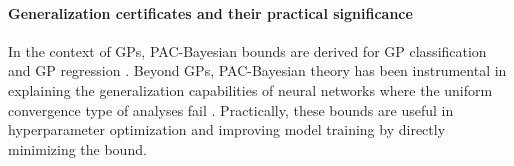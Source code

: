 %


\paragraph{Generalization certificates and their practical significance}
In the context of GPs, PAC-Bayesian bounds are derived for GP classification  \citet{seeger2002pac} and GP regression \citep{suzuki2012pac}. 
Beyond GPs, PAC-Bayesian theory has been instrumental in explaining the generalization capabilities of neural networks where the uniform convergence type of analyses fail \citep{dziugaite2017computing,lotfi2022pac}.
Practically, these bounds are useful in hyperparameter optimization \citep{cherian2020efficient} and improving model training \citep{reeb2018learning,wang2023improving} by directly minimizing the bound.

